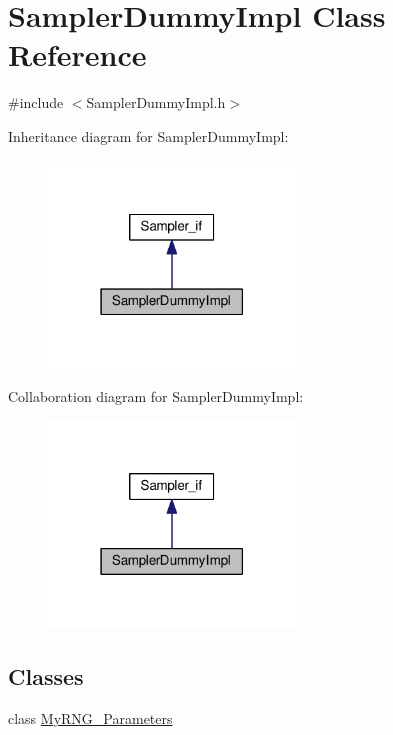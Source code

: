 \hypertarget{class_sampler_dummy_impl}{}\section{Sampler\+Dummy\+Impl Class Reference}
\label{class_sampler_dummy_impl}


{\ttfamily \#include $<$Sampler\+Dummy\+Impl.\+h$>$}



Inheritance diagram for Sampler\+Dummy\+Impl\+:
\nopagebreak
\begin{figure}[H]
\begin{center}
\leavevmode
\includegraphics[width=186pt]{class_sampler_dummy_impl__inherit__graph}
\end{center}
\end{figure}


Collaboration diagram for Sampler\+Dummy\+Impl\+:
\nopagebreak
\begin{figure}[H]
\begin{center}
\leavevmode
\includegraphics[width=186pt]{class_sampler_dummy_impl__coll__graph}
\end{center}
\end{figure}
\subsection*{Classes}
\begin{DoxyCompactItemize}
\item 
class \hyperlink{class_sampler_dummy_impl_1_1_my_r_n_g___parameters}{My\+R\+N\+G\+\_\+\+Parameters}
\end{DoxyCompactItemize}

